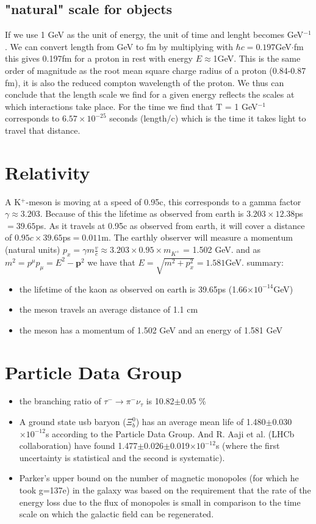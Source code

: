 \documentclass[10pt,a4paper,twoside]{article}
\begin{document}
\subsection{"natural" scale for objects}
If we use 1 GeV as the unit of energy, the unit of time and lenght becomes GeV$^{-1}$. We can convert length from GeV to fm by multiplying with $\hbar c = 0.197$GeV$\cdot$fm this gives 0.197fm for a proton in rest with energy $E \approx $1GeV. This is the same order of magnitude as the root mean square charge radius of a proton (0.84-0.87 fm), it is also the reduced compton wavelength of the proton. We thus can conclude that the length scale we find for a given energy reflects the scales at which interactions take place. For the time we find that T = 1 GeV$^{-1}$ corresponds to $6.57\times10^{-25}$ seconds (length/c) which is the time it takes light to travel that distance. 
\section{Relativity}
A K$^+$-meson is moving at a speed of 0.95c, this corresponds to a gamma factor $\gamma \approx 3.203$. Because of this the lifetime as observed from earth is $3.203\times12.38$ps$ = 39.65$ps. As it travels at 0.95c as observed from earth, it will cover a distance of $0.95c\times 39.65$ps$ = 0.011$m. The earthly observer will measure a momentum (natural units) $p_x = \gamma m \frac{v}{c} \approx 3.203\times0.95\times m_{K^+}$ = 1.502 GeV. and as $m^2 = p^\mu p_\mu = E^2 - \boldsymbol{p}^2$ we have that $E = \sqrt{m^2 + p_x^2} = 1.581$GeV.
summary:
\begin{itemize}
	\item the lifetime of the kaon as observed on earth is 39.65ps (1.66$\times10^{-14}$GeV)
	\item the meson travels an average distance of 1.1 cm
	\item the meson has a momentum of 1.502 GeV and an energy of 1.581 GeV
\end{itemize}
\section{Particle Data Group}
\begin{itemize}
	\item the branching ratio of $\tau^- \rightarrow \pi^-\nu_\tau$ is 10.82$\pm$0.05 \%
	\item A ground state usb baryon ($\Xi^0_b$) has an average mean life of 1.480$\pm$0.030$\times10^{-12}$s according to the Particle Data Group. And R. Aaji et al. (LHCb collaboration) have found 1.477$\pm$0.026$\pm$0.019$\times10^{-12}$s\cite{XiLifeB} (where the first uncertainty is statistical and the second is systematic).
	\item Parker's upper bound on the number of magnetic monopoles (for which he took g=137e\cite{monopoles}) in the galaxy was based on the requirement that the rate of the energy loss due to the flux of monopoles is small in comparison to the time scale on which the galactic field can be regenerated.
\end{itemize}


\end{document}
